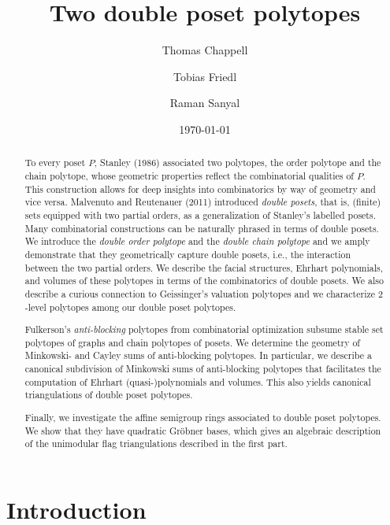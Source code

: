 \documentclass[11pt]{amsart}
\title{Two double poset polytopes}
\author{Thomas Chappell}
\author{Tobias Friedl}
\author{Raman Sanyal}
\date{\today}
\theoremstyle{definition}
\begin{document}
\begin{abstract}
    To every poset ${P}$, Stanley (1986) associated two polytopes, the order
    polytope and the chain polytope, whose geometric properties reflect the
    combinatorial qualities of ${P}$. This construction allows for deep
    insights into combinatorics by way of geometry and vice versa.  Malvenuto
    and Reutenauer (2011) introduced \emph{double posets}, that is, (finite)
    sets equipped with two partial orders, as a generalization of Stanley's
    labelled posets. Many combinatorial constructions can be naturally phrased
    in terms of double posets.  We introduce the \emph{double order polytope}
    and the \emph{double chain polytope} and we amply demonstrate that they
    geometrically capture double posets, i.e., the interaction between the two
    partial orders. We describe the facial structures, Ehrhart polynomials, and
    volumes of these polytopes in terms of the combinatorics of double posets.
    We also describe a curious connection to Geissinger's valuation polytopes
    and we characterize $2$-level polytopes among our double poset polytopes.

    Fulkerson's \emph{anti-blocking} polytopes from combinatorial optimization
    subsume stable set polytopes of graphs and chain polytopes of posets. We
    determine the geometry of Minkowski- and Cayley sums of anti-blocking
    polytopes. In particular, we describe a canonical subdivision of Minkowski
    sums of anti-blocking polytopes that facilitates the computation of
    Ehrhart (quasi-)polynomials and volumes. This also yields canonical
    triangulations of double poset polytopes.
    
    Finally, we investigate the affine semigroup rings associated to 
    double poset polytopes. We show that they have quadratic Gr\"obner bases,
    which gives an algebraic description of the unimodular flag triangulations
    described in the first part.
\end{abstract}

\maketitle

\section{Introduction}\label{sec:intro}
\end{document}
